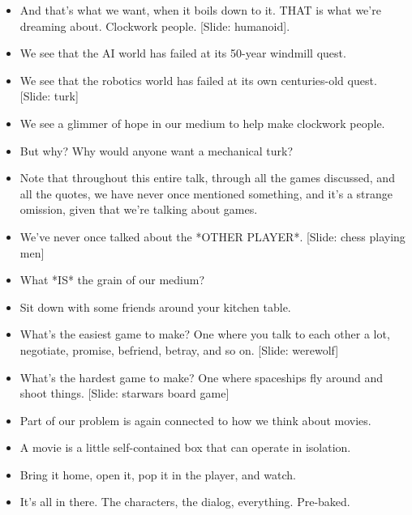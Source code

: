 \documentclass[12pt]{article}
\begin{document}
{\begin{itemize}
\item And that's what we want, when it boils down to it.  THAT is what we're dreaming about.  Clockwork people. [Slide: humanoid].  

\item We see that the AI world has failed at its 50-year windmill quest.  

\item We see that the robotics world has failed at its own centuries-old quest. [Slide: turk]  

\item We see a glimmer of hope in our medium to help make clockwork people.


\item But why?  Why would anyone want a mechanical turk?  

\item Note that throughout this entire talk, through all the games discussed, and all the quotes, we have never once mentioned something, and it's a strange omission, given that we're talking about games.  

\item We've never once talked about the *OTHER PLAYER*.  [Slide: chess playing men]

\item What *IS* the grain of our medium?

\item Sit down with some friends around your kitchen table.

\item What's the easiest game to make?  One where you talk to each other a lot, negotiate, promise, befriend, betray, and so on. [Slide: werewolf]

\item What's the hardest game to make?  One where spaceships fly around and shoot things. [Slide: starwars board game]

\item Part of our problem is again connected to how we think about movies.  

\item A movie is a little self-contained box that can operate in isolation.  

\item Bring it home, open it, pop it in the player, and watch.

\item It's all in there.  The characters, the dialog, everything.  Pre-baked.


\end{itemize}}
\end{document}
